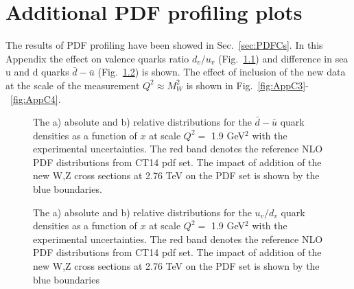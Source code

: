 \chapter{Additional PDF profiling plots}\label{app:PDF}

The results of PDF profiling have been showed in Sec.~\ref{sec:PDFCs}. In this Appendix the effect on valence quarks ratio $d_{v}/u_{v}$ (Fig.~\ref{fig:AppC1}) and difference in sea u and d quarks $\bar{d}-\bar{u}$ (Fig.~\ref{fig:AppC2}) is shown. The effect of inclusion of the new data at the scale of the measurement $Q^2 \approx M^2_{W}$ is shown in Fig.~\ref{fig:AppC3}-~\ref{fig:AppC4}. 

\begin{figure}[!h]
\begin{minipage}[h]{0.49\linewidth}
\end{minipage}
\hfill
\begin{minipage}[h]{0.49\linewidth}
\end{minipage}
\caption{The a) absolute and  b) relative distributions for the $\bar{d}-\bar{u}$ quark densities as a function of $x$ at scale $Q^2=$ 1.9 GeV$^2$ with the experimental uncertainties. The red band denotes the reference NLO PDF distributions from CT14 pdf set. The impact of addition of the new W,Z cross sections at 2.76 TeV on the PDF set is shown by the blue boundaries.}
\label{fig:AppC1}
\end{figure}

\begin{figure}[!h]
\begin{minipage}[h]{0.49\linewidth}
\end{minipage}
\hfill
\begin{minipage}[h]{0.49\linewidth}
\end{minipage}
\caption{The a) absolute and  b) relative distributions for the $u_v / d_v$ quark densities as a function of $x$ at scale $Q^2=$ 1.9 GeV$^2$ with the experimental uncertainties. The red band denotes the reference NLO PDF distributions from CT14 pdf set. The impact of addition of the new W,Z cross sections at 2.76 TeV on the PDF set is shown by the blue boundaries}
\label{fig:AppC2}
\end{figure}

